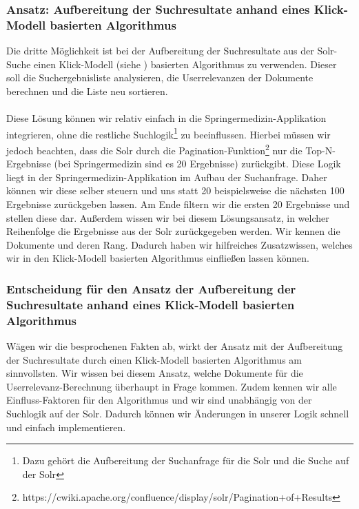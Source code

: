 \subsubsection{Ansatz: Aufbereitung der Suchresultate anhand eines Klick-Modell basierten Algorithmus}
\label{sec:Einfuehrung:Methodik:SucheEinbinden:Suchresultate}

Die dritte Möglichkeit ist bei der Aufbereitung der Suchresultate aus der Solr-Suche einen Klick-Modell (siehe \cite{pbm}) basierten Algorithmus zu verwenden. Dieser soll die Suchergebnisliste analysieren, die Userrelevanzen der Dokumente berechnen und die Liste neu sortieren. 
\\
\\
Diese Lösung können wir relativ einfach in die Springermedizin-Applikation integrieren, ohne die restliche Suchlogik\footnote{Dazu gehört die Aufbereitung der Suchanfrage für die Solr und die Suche auf der Solr} zu beeinflussen. Hierbei müssen wir jedoch beachten, dass die Solr durch die Pagination-Funktion\footnote{https://cwiki.apache.org/confluence/display/solr/Pagination+of+Results} nur die Top-N-Ergebnisse (bei Springermedizin sind es 20 Ergebnisse) zurückgibt. Diese Logik liegt in der Springermedizin-Applikation im Aufbau der Suchanfrage. Daher können wir diese selber steuern und uns statt 20 beispielsweise die nächsten 100 Ergebnisse zurückgeben lassen. Am Ende filtern wir die ersten 20 Ergebnisse und stellen diese dar. Außerdem wissen wir bei diesem Lösungsansatz, in welcher Reihenfolge die Ergebnisse aus der Solr zurückgegeben werden. Wir kennen die Dokumente und deren Rang. Dadurch haben wir hilfreiches Zusatzwissen, welches wir in den Klick-Modell basierten Algorithmus einfließen lassen können.

\subsubsection{Entscheidung für den Ansatz der Aufbereitung der Suchresultate anhand eines Klick-Modell basierten Algorithmus}
\label{sec:Einfuehrung:Methodik:SucheEinbinden:Entscheidung}

Wägen wir die besprochenen Fakten ab, wirkt der Ansatz mit der Aufbereitung der Suchresultate durch einen Klick-Modell basierten Algorithmus am sinnvollsten. Wir wissen bei diesem Ansatz, welche Dokumente für die Userrelevanz-Berechnung überhaupt in Frage kommen. Zudem kennen wir alle Einfluss-Faktoren für den Algorithmus und wir sind unabhängig von der Suchlogik auf der Solr. Dadurch können wir Änderungen in unserer Logik schnell und einfach implementieren.


